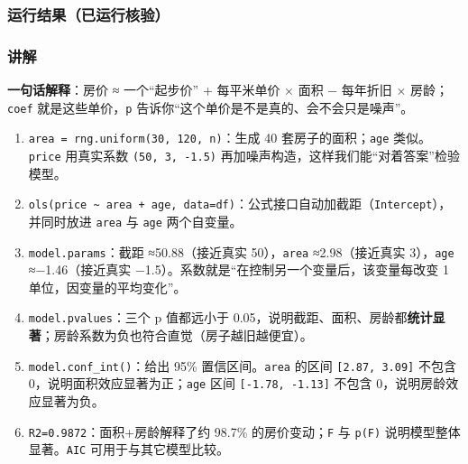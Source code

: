 \subsubsection{运行结果（已运行核验）}\label{ux8fd0ux884cux7ed3ux679cux5df2ux8fd0ux884cux6838ux9a8c-27}

\begin{Shaded}
\begin{Highlighting}[]
\end{Highlighting}
\end{Shaded}

\subsubsection{讲解}\label{ux8bb2ux89e3-27}

\textbf{一句话解释}：房价 ≈ 一个``起步价'' + 每平米单价 × 面积 −
每年折旧 × 房龄；\texttt{coef} 就是这些单价，\texttt{p}
告诉你``这个单价是不是真的、会不会只是噪声''。

\begin{enumerate}
\def\labelenumi{\arabic{enumi}.}
\tightlist
\item
  \texttt{area\ =\ rng.uniform(30,\ 120,\ n)}：生成 40
  套房子的面积；\texttt{age} 类似。\texttt{price} 用真实系数
  \texttt{(50,\ 3,\ -1.5)}
  再加噪声构造，这样我们能``对着答案''检验模型。
\item
  \texttt{ols(\textquotesingle{}price\ \textasciitilde{}\ area\ +\ age\textquotesingle{},\ data=df)}：公式接口自动加截距（\texttt{Intercept}），并同时放进
  \texttt{area} 与 \texttt{age} 两个自变量。
\item
  \texttt{model.params}：截距 ≈50.88（接近真实 50），\texttt{area}
  ≈2.98（接近真实 3），\texttt{age} ≈−1.46（接近真实
  −1.5）。系数就是``在控制另一个变量后，该变量每改变 1
  单位，因变量的平均变化''。
\item
  \texttt{model.pvalues}：三个 p 值都远小于
  0.05，说明截距、面积、房龄都\textbf{统计显著}；房龄系数为负也符合直觉（房子越旧越便宜）。
\item
  \texttt{model.conf\_int()}：给出 95\% 置信区间。\texttt{area} 的区间
  \texttt{{[}2.87,\ 3.09{]}} 不包含
  0，说明面积效应显著为正；\texttt{age} 区间
  \texttt{{[}-1.78,\ -1.13{]}} 不包含 0，说明房龄效应显著为负。
\item
  \texttt{R2=0.9872}：面积+房龄解释了约 98.7\% 的房价变动；\texttt{F} 与
  \texttt{p(F)} 说明模型整体显著。\texttt{AIC} 可用于与其它模型比较。
\end{enumerate}

